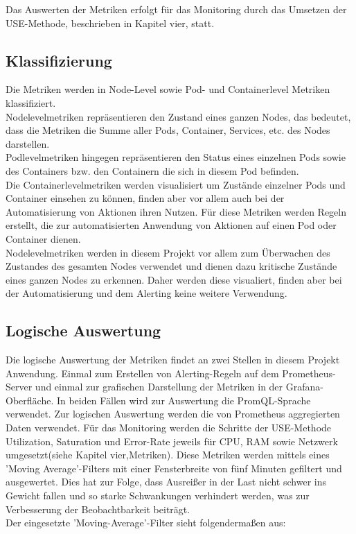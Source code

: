 \documentclass[a4paper,10pt]{scrartcl}
\begin{document}
Das Auswerten der Metriken erfolgt für das Monitoring durch das Umsetzen der USE-Methode, beschrieben in Kapitel vier, statt.

\subsection{Klassifizierung}

Die Metriken werden in Node-Level sowie Pod- und Containerlevel Metriken klassifiziert.\\
Nodelevelmetriken repräsentieren den Zustand eines ganzen Nodes, das bedeutet, dass die Metriken die Summe aller Pods, Container, Services, etc. des Nodes darstellen.\\
Podlevelmetriken hingegen repräsentieren den Status eines einzelnen Pods sowie des Containers bzw. den Containern die sich in diesem Pod befinden.\\
Die Containerlevelmetriken werden visualisiert um Zustände einzelner Pods und Container einsehen zu können, finden aber vor allem auch bei der Automatisierung von Aktionen ihren Nutzen. Für diese Metriken werden Regeln erstellt, die zur automatisierten Anwendung von Aktionen auf einen Pod oder Container dienen.\\
Nodelevelmetriken werden in diesem Projekt vor allem zum Überwachen des Zustandes des gesamten Nodes verwendet und dienen dazu kritische Zustände eines ganzen Nodes zu erkennen. Daher werden diese visualiert, finden aber bei der Automatisierung und dem Alerting keine weitere Verwendung.

\subsection{Logische Auswertung}

Die logische Auswertung der Metriken findet an zwei Stellen in diesem Projekt Anwendung. Einmal zum Erstellen von Alerting-Regeln auf dem Prometheus-Server und einmal zur grafischen Darstellung der Metriken in der Grafana-Oberfläche. In beiden Fällen wird zur Auswertung die PromQL-Sprache verwendet.
Zur logischen Auswertung werden die von Prometheus aggregierten Daten verwendet. Für das Monitoring werden die Schritte der USE-Methode Utilization, Saturation und Error-Rate jeweils für CPU, RAM sowie Netzwerk umgesetzt(siehe Kapitel vier,Metriken). Diese Metriken werden mittels eines 'Moving Average'-Filters mit einer Fensterbreite von fünf Minuten gefiltert und ausgewertet. Dies hat zur Folge, dass Ausreißer in der Last nicht schwer ins Gewicht fallen und so starke Schwankungen verhindert werden, was zur Verbesserung der Beobachtbarkeit beiträgt.\\
Der eingesetzte 'Moving-Average'-Filter sieht folgendermaßen aus:\\
\end{document}
